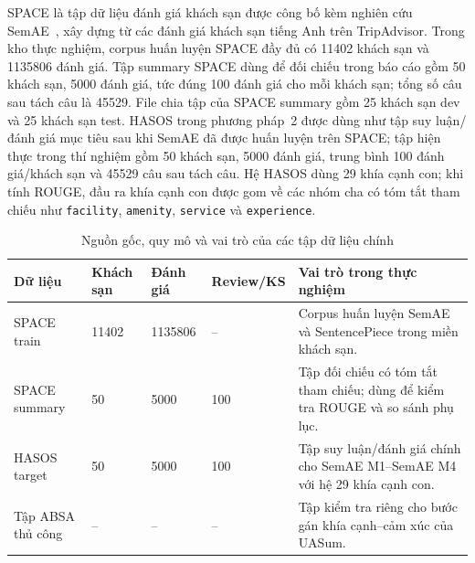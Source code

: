SPACE là tập dữ liệu đánh giá khách sạn được công bố kèm nghiên cứu SemAE~\cite{angelidis2021extractive}, xây dựng từ các đánh giá khách sạn tiếng Anh trên TripAdvisor. Trong kho thực nghiệm, corpus huấn luyện SPACE đầy đủ có \num{11402} khách sạn và \num{1135806} đánh giá. Tập summary SPACE dùng để đối chiếu trong báo cáo gồm \num{50} khách sạn, \num{5000} đánh giá, tức đúng \num{100} đánh giá cho mỗi khách sạn; tổng số câu sau tách câu là \num{45529}. File chia tập của SPACE summary gồm \num{25} khách sạn dev và \num{25} khách sạn test. HASOS trong phương pháp~2 được dùng như tập suy luận/đánh giá mục tiêu sau khi SemAE đã được huấn luyện trên SPACE; tập hiện thực trong thí nghiệm gồm \num{50} khách sạn, \num{5000} đánh giá, trung bình \num{100} đánh giá/khách sạn và \num{45529} câu sau tách câu. Hệ HASOS dùng \num{29} khía cạnh con; khi tính ROUGE, đầu ra khía cạnh con được gom về các nhóm cha có tóm tắt tham chiếu như \texttt{facility}, \texttt{amenity}, \texttt{service} và \texttt{experience}.

\begin{table}[tbp]
\centering
\caption{Nguồn gốc, quy mô và vai trò của các tập dữ liệu chính}
\label{tab:experimental-datasets}
\small
\setlength{\tabcolsep}{4pt}
\renewcommand{\arraystretch}{1.12}
\begin{tabularx}{\textwidth}{L{0.20\textwidth} R{0.12\textwidth} R{0.14\textwidth} R{0.14\textwidth} Y}
\toprule
\textbf{Dữ liệu} & \textbf{Khách sạn} & \textbf{Đánh giá} & \textbf{Review/KS} & \textbf{Vai trò trong thực nghiệm} \\
\midrule
SPACE train & \num{11402} & \num{1135806} & -- & Corpus huấn luyện SemAE và SentencePiece trong miền khách sạn. \\
SPACE summary & \num{50} & \num{5000} & \num{100} & Tập đối chiếu có tóm tắt tham chiếu; dùng để kiểm tra ROUGE và so sánh phụ lục. \\
HASOS target & \num{50} & \num{5000} & \num{100} & Tập suy luận/đánh giá chính cho SemAE M1--SemAE M4 với hệ 29 khía cạnh con. \\
Tập ABSA thủ công & -- & -- & -- & Tập kiểm tra riêng cho bước gán khía cạnh--cảm xúc của UASum. \\
\bottomrule
\end{tabularx}
\end{table}

